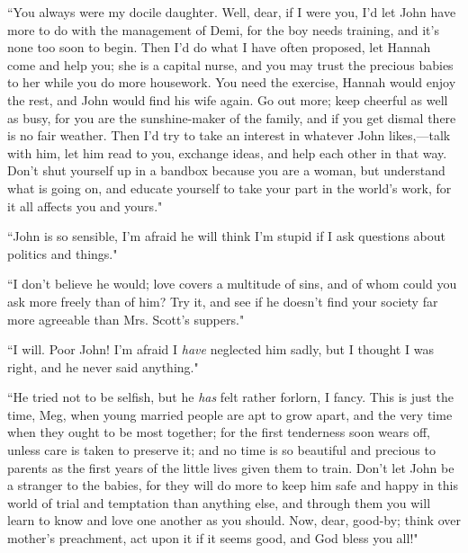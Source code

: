 ``You always were my docile daughter. Well, dear, if I were you,
I'd let John have more to do with the management of
Demi, for the boy needs training, and it's none too soon
to begin. Then I'd do what I have often proposed, let
Hannah come and help you; she is a capital nurse, and you may trust the
precious babies to her while you do more housework. You need the
exercise, Hannah would enjoy the rest, and John would find his wife
again. Go out more; keep cheerful as well as busy, for you are the
sunshine-maker of the family, and if you get dismal there is no fair
weather. Then I'd try to take an interest in whatever
John likes,---talk with him, let him read to you, exchange ideas, and
help each other in that way. Don't shut yourself up in a
bandbox because you are a woman, but understand what is going on, and
educate yourself to take your part in the world's work,
for it all affects you and yours."

``John is so sensible, I'm afraid he will think
I'm stupid if I ask questions about politics and
things."

``I don't believe he would; love covers a multitude of
sins, and of whom could you ask more freely than of him? Try it, and see
if he doesn't find your society far more agreeable than
Mrs. Scott's suppers."

``I will. Poor John! I'm afraid I \emph{have} neglected
him sadly, but I thought I was right, and he never said anything."

``He tried not to be selfish, but he \emph{has} felt rather forlorn, I
fancy. This is just the time, Meg, when young married people are apt to
grow apart, and the very time when they ought to be most together; for
the first tenderness soon wears off, unless care is taken to preserve
it; and no time is so beautiful and precious to parents as the first
years of the little lives given them to train. Don't let
John be a stranger to the babies, for they will do more to keep him safe
and happy in this world of trial and temptation than anything else, and
through them you will learn to know and love one another as you should.
Now, dear, good-by; think over mother's preachment, act
upon it if it seems good, and God bless you all!"

